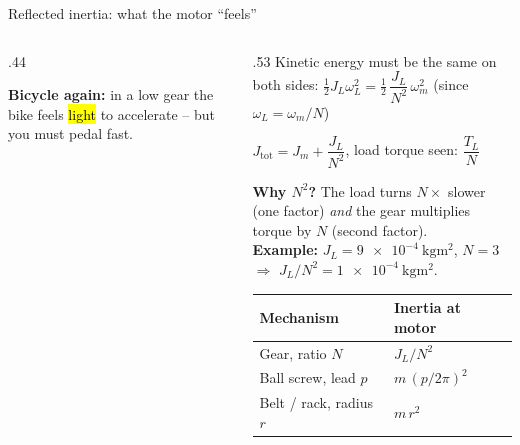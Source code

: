 \documentclass[aspectratio=169,10pt]{beamer}
\begin{document}
\begin{frame}{Reflected inertia: what the motor ``feels''}
\begin{columns}[T]
\begin{column}{.44\textwidth}
\centering
{}

\vspace{3mm}
\small
\textbf{Bicycle again:} in a low gear the bike feels \hl{light} to accelerate -- but you must pedal fast.
\end{column}
\begin{column}{.53\textwidth}
\small
Kinetic energy must be the same on both sides:
$\tfrac12 J_L\omega_L^2=\tfrac12\,\dfrac{J_L}{N^2}\,\omega_m^2$ \; (since $\omega_L=\omega_m/N$)
\begin{eqbox}
$J_\text{tot}=J_m+\dfrac{J_L}{N^2}$, \qquad load torque seen: $\dfrac{T_L}{N}$
\end{eqbox}
\textbf{Why $N^2$?} The load turns $N\times$ slower (one factor) \emph{and} the gear multiplies torque by $N$ (second factor).\\[1mm]
\textbf{Example:} $J_L=\SI{9e-4}{\kilo\gram\metre\squared}$, $N=3$ $\Rightarrow$ $J_L/N^2=\SI{1e-4}{\kilo\gram\metre\squared}$.\\[1mm]
\renewcommand{\arraystretch}{1.05}
\begin{tabular}{@{}ll@{}}
\toprule
\textbf{Mechanism} & \textbf{Inertia at motor}\\
\midrule
Gear, ratio $N$ & $J_L/N^2$\\
Ball screw, lead $p$ & $m\,(p/2\pi)^2$\\
Belt / rack, radius $r$ & $m\,r^2$\\
\bottomrule
\end{tabular}
\end{column}
\end{columns}
\end{frame}
\end{document}

